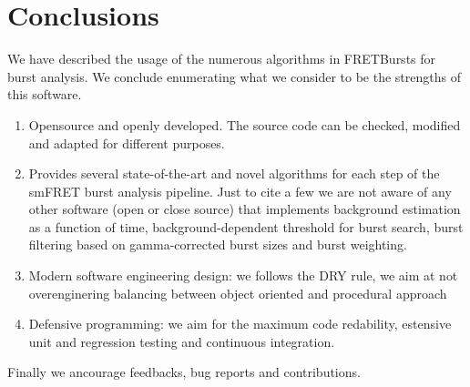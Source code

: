 \section{Conclusions}

We have described the usage of the numerous algorithms in FRETBursts
for burst analysis. We conclude enumerating what we consider to be the strengths
of this software.

\begin{enumerate}
\item Opensource and openly developed. The source code can be checked, modified and
adapted for different purposes. 
\item Provides several state-of-the-art and novel algorithms for each step of the 
smFRET burst analysis pipeline. Just to cite a few we are not aware of any other software
(open or close source) that implements background estimation as a function of time,
background-dependent threshold for burst search, burst filtering based on 
gamma-corrected burst sizes and burst weighting.
\item Modern software engineering design: we follows the DRY rule, we aim at not
overenginering balancing between object oriented and procedural approach
\item Defensive programming: we aim for the maximum code redability,
estensive unit and regression testing and continuous integration.
\end{enumerate}

Finally we ancourage feedbacks, bug reports and contributions.